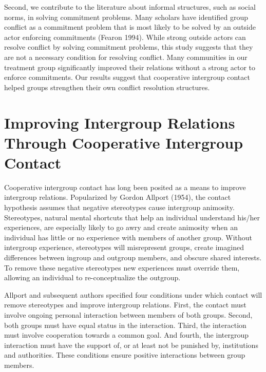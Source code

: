 \documentclass[11pt]{article}
\begin{document}
Second, we contribute to the literature about informal structures, such
as social norms, in solving commitment problems. Many scholars have
identified group conflict as a commitment problem that is most likely to
be solved by an outside actor enforcing commitments (Fearon 1994). While
strong outside actors can resolve conflict by solving commitment
problems, this study suggests that they are not a necessary condition
for resolving conflict. Many communities in our treatment group
significantly improved their relations without a strong actor to enforce
commitments. Our results suggest that cooperative intergroup contact
helped groups strengthen their own conflict resolution structures.

\hypertarget{improving-intergroup-relations-through-cooperative-intergroup-contact}{%
\section{Improving Intergroup Relations Through Cooperative Intergroup
Contact}\label{improving-intergroup-relations-through-cooperative-intergroup-contact}}

Cooperative intergroup contact has long been posited as a means to
improve intergroup relations. Popularized by Gordon Allport (1954), the
contact hypothesis assumes that negative stereotypes cause intergroup
animosity. Stereotypes, natural mental shortcuts that help an individual
understand his/her experiences, are especially likely to go awry and
create animosity when an individual has little or no experience with
members of another group. Without intergroup experience, stereotypes
will misrepresent groups, create imagined differences between ingroup
and outgroup members, and obscure shared interests. To remove these
negative stereotypes new experiences must override them, allowing an
individual to re-conceptualize the outgroup.

Allport and subsequent authors specified four conditions under which
contact will remove stereotypes and improve intergroup relations. First,
the contact must involve ongoing personal interaction between members of
both groups. Second, both groups must have equal status in the
interaction. Third, the interaction must involve cooperation towards a
common goal. And fourth, the intergroup interaction must have the
support of, or at least not be punished by, institutions and
authorities. These conditions ensure positive interactions between group
members.
\end{document}
